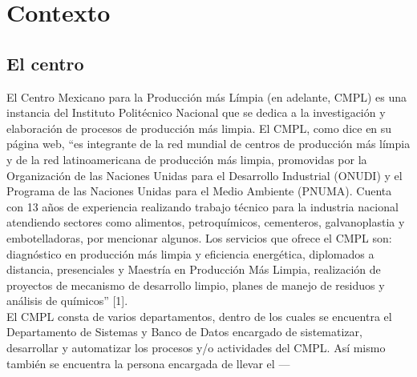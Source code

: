 \section{Contexto}

\subsection{El centro}

El Centro Mexicano para la Producción más Límpia (en adelante, CMPL) es una instancia del Instituto Politécnico Nacional que se dedica a la investigación y elaboración de procesos de producción más limpia. El CMPL, como dice en su página web, “es integrante de la red mundial de centros de producción más límpia y de la red latinoamericana de producción más limpia, promovidas por la Organización de las Naciones Unidas para el Desarrollo Industrial (ONUDI) y el Programa de las Naciones Unidas para el Medio Ambiente (PNUMA). Cuenta con 13 años de experiencia realizando trabajo técnico para la industria nacional atendiendo sectores como alimentos, petroquímicos, cementeros, galvanoplastia y embotelladoras, por mencionar algunos. Los servicios que ofrece el CMPL son: diagnóstico en producción más limpia y eficiencia energética, diplomados a distancia, presenciales y Maestría en Producción Más Limpia, realización de proyectos de mecanismo de desarrollo limpio, planes de manejo de residuos y análisis de químicos” [1].\\

El CMPL consta de varios departamentos, dentro de los cuales  se encuentra el Departamento de Sistemas y Banco de Datos encargado de sistematizar, desarrollar y automatizar los procesos y/o actividades del CMPL. Así mismo también se encuentra la persona encargada de llevar el ---
